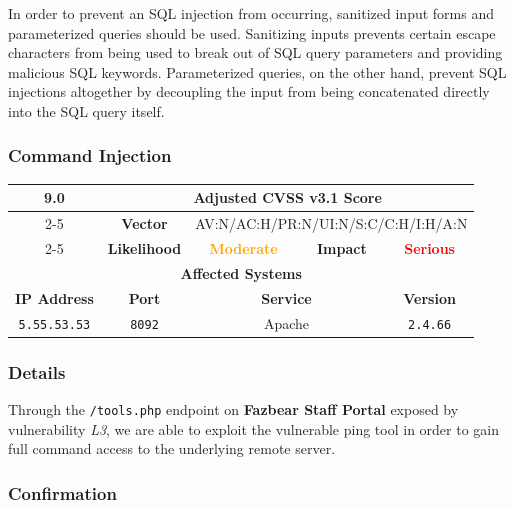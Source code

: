 \documentclass[12pt, letterpaper]{article}
\begin{document}
In order to prevent an SQL injection from occurring, sanitized input
forms and parameterized queries should be used. Sanitizing inputs
prevents certain escape characters from being used to break out of
SQL query parameters and providing malicious SQL keywords.
Parameterized queries, on the other hand, prevent SQL injections
altogether by decoupling the input from being concatenated directly
into the SQL query itself.

\clearpage
\subsubsection{Command Injection}

\begin{table}[!ht]
  \centering
  \renewcommand{\arraystretch}{1.8} %
  \begin{tabular}{|c|c|c|c|c|}
    \hline
    \multirow{3}{*}{\textcolor{RoyalPurple}{\textbf{\huge 9.0}}} &
    \multicolumn{4}{c|}{\textbf{Adjusted CVSS v3.1 Score}} \\ \cline{2-5}
    & \textbf{Vector} &
    \multicolumn{3}{c|}{AV:N/AC:H/PR:N/UI:N/S:C/C:H/I:H/A:N} \\ \cline{2-5}
    & \textbf{Likelihood} & \textcolor{orange}{\textbf{Moderate}}
    & \textbf{Impact} & \textcolor{red}{\textbf{Serious}} \\ \hline
    \multicolumn{5}{|c|}{\textbf{Affected Systems}} \\ \hline
    \textbf{IP Address} & \textbf{Port} &
    \multicolumn{2}{c|}{\textbf{Service}} & \textbf{Version} \\ \hline
    \texttt{5.55.53.53} & \texttt{8092} & \multicolumn{2}{c|}{Apache}
    & \texttt{2.4.66} \\ \hline
  \end{tabular}
\end{table}
\FloatBarrier

\subsubsection*{Details}

Through the \texttt{/tools.php} endpoint on \textbf{Fazbear Staff
Portal} exposed by vulnerability \textit{L3}, we are able to exploit
the vulnerable ping tool in order to gain full command access to the
underlying remote server.

\subsubsection*{Confirmation}
\end{document}
